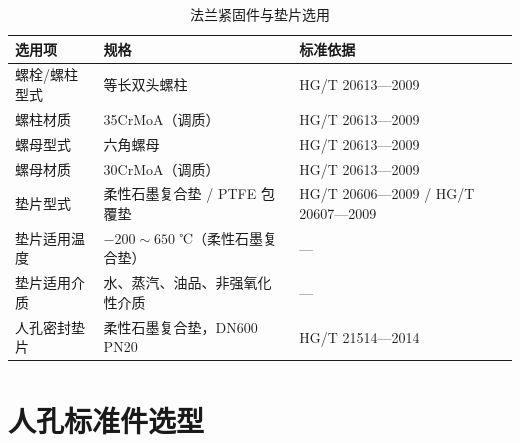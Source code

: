 \begin{table}[htbp]
  \centering
  \caption{法兰紧固件与垫片选用}
  \label{tab:cad-bolts-gaskets}
  \small\renewcommand{\arraystretch}{1.2}
  \setlength{\tabcolsep}{8pt}
  \begin{tabularx}{\textwidth}{@{}l l l @{}}
    \toprule
    \textbf{选用项} & \textbf{规格} & \textbf{标准依据} \\
    \midrule
    螺栓/螺柱型式      & 等长双头螺柱                    & HG/T 20613—2009 \\
    螺柱材质           & 35CrMoA（调质）                 & HG/T 20613—2009 \\
    螺母型式           & 六角螺母                        & HG/T 20613—2009 \\
    螺母材质           & 30CrMoA（调质）                 & HG/T 20613—2009 \\
    垫片型式           & 柔性石墨复合垫 / PTFE 包覆垫     & HG/T 20606—2009 / HG/T 20607—2009 \\
    垫片适用温度       & $-200\sim650$ ℃（柔性石墨复合垫）& — \\
    垫片适用介质       & 水、蒸汽、油品、非强氧化性介质  & — \\
    人孔密封垫片       & 柔性石墨复合垫，DN600 PN20       & HG/T 21514—2014 \\
    \bottomrule
  \end{tabularx}
\end{table}

\section{人孔标准件选型}
\label{sec:cad-manhole}

